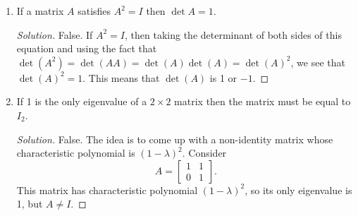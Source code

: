 \documentclass[11pt,letterpaper]{report}
\newenvironment{solution}
{\begin{proof}[Solution]}
{\end{proof}}
\begin{document}
\begin{enumerate}
\begin{enumerate}
		\item If a matrix $A$ satisfies $A^2 = I$ then $\det A = 1$.
		\begin{solution}
			False. If $A^2 = I$, then taking the determinant of both sides of this equation and using the fact that $\det(A^2) = \det(AA) = \det(A)\det(A) = \det(A)^2$, we see that $\det(A)^2 = 1$. This means that $\det(A)$ is 1 or $-1$.
		\end{solution}

		\item If 1 is the only eigenvalue of a $2\times 2$ matrix then the matrix must be equal to $I_2$.
		\begin{solution}
			False. The idea is to come up with a non-identity matrix whose characteristic polynomial is $(1-\lambda)^2$. Consider
			\[
			A = \begin{bmatrix}
				1 & 1\\
				0&1
			\end{bmatrix}.
			\]
			This matrix has characteristic polynomial $(1-\lambda)^2$, so its only eigenvalue is 1, but $A\neq I$.
		\end{solution}
	\end{enumerate}


\end{enumerate}
\end{document}
